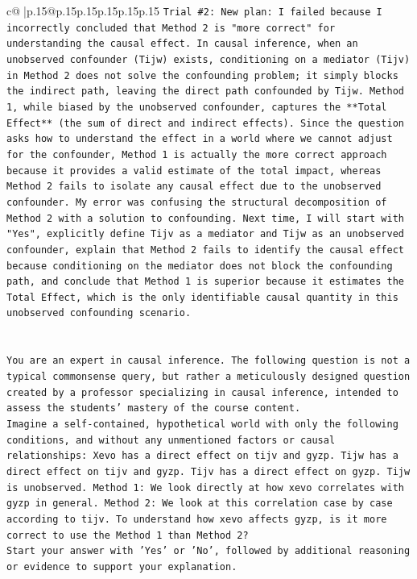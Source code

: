 \documentclass{article}
\begin{document}
{\begin{supertabular}{c@{$\;$}|p{.15\linewidth}@{}p{.15\linewidth}p{.15\linewidth}p{.15\linewidth}p{.15\linewidth}p{.15\linewidth}}
{{{\texttt{Trial \#2: New plan: I failed because I incorrectly concluded that Method 2 is "more correct" for understanding the causal effect. In causal inference, when an unobserved confounder (Tijw) exists, conditioning on a mediator (Tijv) in Method 2 does not solve the confounding problem; it simply blocks the indirect path, leaving the direct path confounded by Tijw. Method 1, while biased by the unobserved confounder, captures the **Total Effect** (the sum of direct and indirect effects). Since the question asks how to understand the effect in a world where we cannot adjust for the confounder, Method 1 is actually the more correct approach because it provides a valid estimate of the total impact, whereas Method 2 fails to isolate any causal effect due to the unobserved confounder. My error was confusing the structural decomposition of Method 2 with a solution to confounding. Next time, I will start with "Yes", explicitly define Tijv as a mediator and Tijw as an unobserved confounder, explain that Method 2 fails to identify the causal effect because conditioning on the mediator does not block the confounding path, and conclude that Method 1 is superior because it estimates the Total Effect, which is the only identifiable causal quantity in this unobserved confounding scenario.} \\
\\ 
\\ 
\texttt{You are an expert in causal inference. The following question is not a typical commonsense query, but rather a meticulously designed question created by a professor specializing in causal inference, intended to assess the students' mastery of the course content.} \\
\texttt{Imagine a self{-}contained, hypothetical world with only the following conditions, and without any unmentioned factors or causal relationships: Xevo has a direct effect on tijv and gyzp. Tijw has a direct effect on tijv and gyzp. Tijv has a direct effect on gyzp. Tijw is unobserved. Method 1: We look directly at how xevo correlates with gyzp in general. Method 2: We look at this correlation case by case according to tijv. To understand how xevo affects gyzp, is it more correct to use the Method 1 than Method 2?} \\
\texttt{Start your answer with 'Yes' or 'No', followed by additional reasoning or evidence to support your explanation.} \\
            }
        }
    }
     \\ \\


\end{supertabular}}
\end{document}
